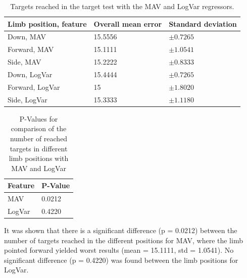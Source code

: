 \documentclass[a4paper, 10pt, conference]{ieeeconf}      %
\begin{document}
\begin{multicol}{2}
	\begin{table}[H]
		\begin{center}
			\begin{tabular}{l l l}
				\hline
				\textbf{Limb position, feature} & \textbf{Overall mean error} & \textbf{Standard deviation}\\
				\hline
				Down, MAV & 15.5556 & $\pm 0.7265$ \\
				Forward, MAV & 15.1111 & $\pm 1.0541$ \\
				Side, MAV & 15.2222 & $\pm 0.8333$ \\
				Down, LogVar & 15.4444 & $\pm 0.7265$ \\
				Forward, LogVar & 15 & $\pm 1.8020$ \\
				Side, LogVar & 15.3333 & $\pm 1.1180$ \\
				\hline
			\end{tabular}
			\caption{Targets reached in the target test with the MAV and LogVar regressors.}
		\end{center}
	\end{table}
	
	\begin{table}[H]
		\begin{center}
			\begin{tabular}{l l}
				\hline
				\textbf{Feature} & \textbf{P-Value}\\
				\hline
				MAV & 0.0212 \\
				LogVar & 0.4220 \\
				\hline
			\end{tabular}
			\caption{P-Values for comparison of the number of reached targets in different limb positions with MAV and LogVar}
		\end{center}
	\end{table}
	
	It was shown that there is a significant difference (p = 0.0212) between the number of targets reached in the different positions for MAV, where the limb pointed forward yielded worst results (mean = 15.1111, std = 1.0541). No significant difference (p = 0.4220) was found between the limb positions for LogVar.
	
	
	

\end{multicol}
\end{document}
